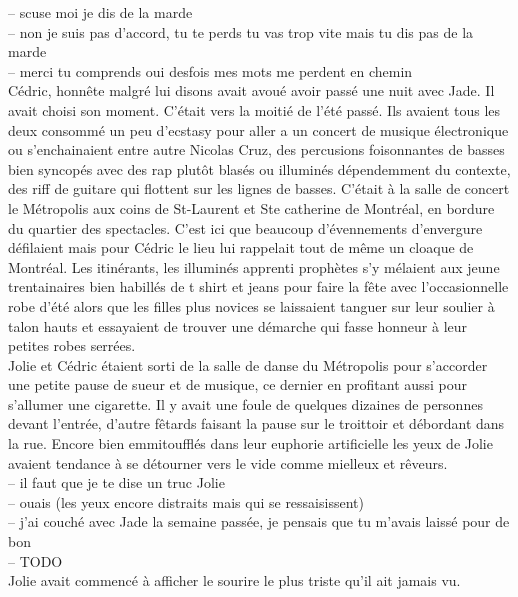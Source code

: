 \documentclass{article}
\begin{document}
-- scuse moi je dis de la marde \\
-- non je suis pas d'accord, tu te perds tu vas trop vite mais tu dis pas de la marde\\
-- merci tu comprends oui desfois mes mots me perdent en chemin\\

Cédric, honnête malgré lui disons avait avoué avoir passé une nuit avec Jade. Il
avait choisi son moment. C'était vers la moitié de l'été passé. Ils avaient tous
les deux consommé un peu d'ecstasy pour aller a un concert de musique
électronique ou s'enchainaient entre autre Nicolas Cruz, des percusions
foisonnantes de basses bien syncopés avec des rap plutôt blasés ou illuminés
dépendemment du contexte, des riff de guitare qui flottent sur les lignes de
basses. C'était à la salle de concert le Métropolis aux coins de St-Laurent et
Ste catherine de Montréal, en bordure du quartier des spectacles. C'est ici que
beaucoup d'évennements d'envergure défilaient mais pour Cédric le lieu lui
rappelait tout de même un cloaque de Montréal. Les itinérants, les illuminés
apprenti prophètes s'y mélaient aux jeune trentainaires bien habillés de t shirt
et jeans pour faire la fête avec l'occasionnelle robe d'été alors que les filles
plus novices se laissaient tanguer sur leur soulier à talon hauts et essayaient
de trouver une démarche qui fasse honneur à leur petites robes serrées.\\

Jolie et Cédric étaient sorti de la salle de danse du Métropolis pour s'accorder
une petite pause de sueur et de musique, ce dernier en profitant aussi pour
s'allumer une cigarette. Il y avait une foule de quelques dizaines de personnes
devant l'entrée, d'autre fêtards faisant la pause sur le troittoir et débordant
dans la rue. Encore bien emmitoufflés dans leur euphorie artificielle les yeux
de Jolie avaient tendance à se détourner vers le vide comme mielleux et rêveurs.\\

-- il faut que je te dise un truc Jolie\\
-- ouais (les yeux encore distraits mais qui se ressaisissent)\\
-- j'ai couché avec Jade la semaine passée, je pensais que tu m'avais laissé pour de bon\\
--  TODO \\

Jolie avait commencé à afficher le sourire le plus triste qu'il ait jamais vu.
\end{document}
